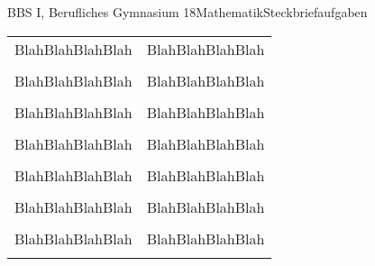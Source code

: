 \documentclass[11pt,oneside,openany,headings=optiontotoc,11pt,numbers=noenddot]{article}
\begin{document}
\begin{worksheet}{BBS I, Berufliches Gymnasium 18}{Mathematik}{Steckbriefaufgaben}
\begin{tabularx}{\textwidth}{|L{5cm}|X|}
			& \\
			\hline
			\color{white}BlahBlahBlahBlah & \color{white}BlahBlahBlahBlah\\
			& \\
			\hline
			\color{white}BlahBlahBlahBlah & \color{white}BlahBlahBlahBlah\\
			& \\
			\hline
			\color{white}BlahBlahBlahBlah & \color{white}BlahBlahBlahBlah\\
			& \\
			\hline
			\color{white}BlahBlahBlahBlah & \color{white}BlahBlahBlahBlah\\
			& \\
			\hline
			\color{white}BlahBlahBlahBlah & \color{white}BlahBlahBlahBlah\\
			& \\
			\hline
			\color{white}BlahBlahBlahBlah & \color{white}BlahBlahBlahBlah\\
			& \\
			\hline
			\color{white}BlahBlahBlahBlah & \color{white}BlahBlahBlahBlah\\
			& \\
			\hline
		\end{tabularx}
	\end{worksheet}
\end{document}
